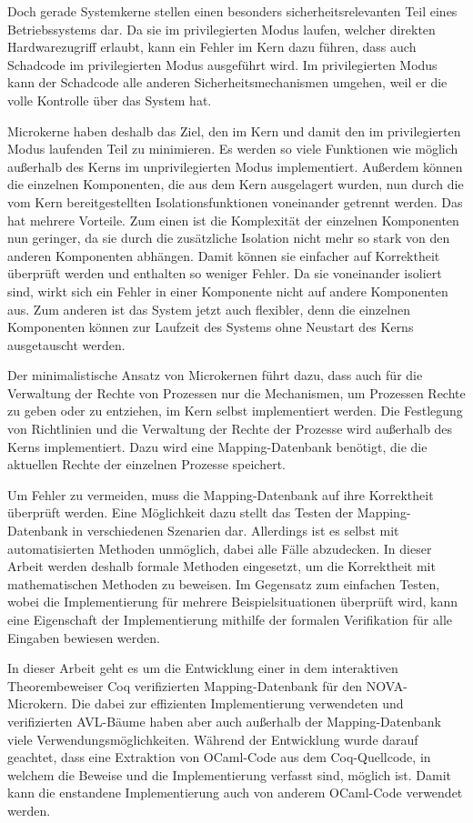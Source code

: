 \documentclass[a4paper, parskip]{scrartcl}
\begin{document}
Doch gerade Systemkerne stellen einen besonders sicherheitsrelevanten Teil eines Betriebssystems dar.
Da sie im privilegierten Modus laufen, welcher direkten Hardwarezugriff erlaubt, kann ein Fehler im Kern dazu führen, dass auch Schadcode im privilegierten Modus ausgeführt wird.
Im privilegierten Modus kann der Schadcode alle anderen Sicherheitsmechanismen umgehen, weil er die volle Kontrolle über das System hat.

Microkerne haben deshalb das Ziel, den im Kern und damit den im privilegierten Modus laufenden Teil zu minimieren. 
Es werden so viele Funktionen wie möglich außerhalb des Kerns im unprivilegierten Modus implementiert. 
Außerdem können die einzelnen Komponenten, die aus dem Kern ausgelagert wurden, nun durch die vom Kern bereitgestellten Isolationsfunktionen voneinander getrennt werden. 
Das hat mehrere Vorteile.
Zum einen ist die Komplexität der einzelnen Komponenten nun geringer, da sie durch die zusätzliche Isolation nicht mehr so stark von den anderen Komponenten abhängen. 
Damit können sie einfacher auf Korrektheit überprüft werden und enthalten so weniger Fehler. 
Da sie voneinander isoliert sind, wirkt sich ein Fehler in einer Komponente nicht auf andere Komponenten aus.
Zum anderen ist das System jetzt auch flexibler, denn die einzelnen Komponenten können zur Laufzeit des Systems ohne Neustart des Kerns ausgetauscht werden.

Der minimalistische Ansatz von Microkernen führt dazu, dass auch für die Verwaltung der Rechte von Prozessen nur die Mechanismen, um Prozessen Rechte zu geben oder zu entziehen, im Kern selbst implementiert werden.
Die Festlegung von Richtlinien und die Verwaltung der Rechte der Prozesse wird außerhalb des Kerns implementiert.
Dazu wird eine Mapping-Datenbank benötigt, die die aktuellen Rechte der einzelnen Prozesse speichert.

Um Fehler zu vermeiden, muss die Mapping-Datenbank auf ihre Korrektheit überprüft werden.
Eine Möglichkeit dazu stellt das Testen der Mapping-Datenbank in verschiedenen Szenarien dar.
Allerdings ist es selbst mit automatisierten Methoden unmöglich, dabei alle Fälle abzudecken.
In dieser Arbeit werden deshalb formale Methoden eingesetzt, um die Korrektheit mit mathematischen Methoden zu beweisen.
Im Gegensatz zum einfachen Testen, wobei die Implementierung für mehrere Beispielsituationen überprüft wird, kann eine Eigenschaft der Implementierung mithilfe der formalen Verifikation für alle Eingaben bewiesen werden.

In dieser Arbeit geht es um die Entwicklung einer in dem interaktiven Theorembeweiser Coq\autocite{coq-web} verifizierten Mapping-Datenbank für den NOVA-Microkern.
Die dabei zur effizienten Implementierung verwendeten und verifizierten AVL-Bäume haben aber auch außerhalb der Mapping-Datenbank viele Verwendungsmöglichkeiten. 
Während der Entwicklung wurde darauf geachtet, dass eine Extraktion von OCaml-Code aus dem Coq-Quellcode, in welchem die Beweise und die Implementierung verfasst sind, möglich ist.
Damit kann die enstandene Implementierung auch von anderem OCaml-Code verwendet werden.
\end{document}
